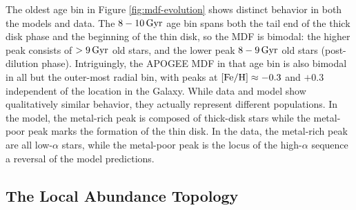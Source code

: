 \documentclass[twocolumn,twocolappendix,linenumbers]{aastex631}
\newcommand{\mathFeH}{{\rm [Fe/H]}}
\newcommand{\Gyr}{\,{\rm Gyr}}
\begin{document}
The oldest age bin in Figure \ref{fig:mdf-evolution} shows distinct behavior in both the models and data. The $8-10\Gyr$ age bin spans both the tail end of the thick disk phase and the beginning of the thin disk, so the MDF is bimodal: the higher peak consists of $>9\Gyr$ old stars, and the lower peak $8-9\Gyr$ old stars (post-dilution phase). Intriguingly, the APOGEE MDF in that age bin is also bimodal in all but the outer-most radial bin, with peaks at $\mathFeH\approx-0.3$ and $+0.3$ independent of the location in the Galaxy. While data and model show qualitatively similar behavior, they actually represent different populations. In the model, the metal-rich peak is composed of thick-disk stars while the metal-poor peak marks the formation of the thin disk. In the data, the metal-rich peak are all low-$\alpha$ stars, while the metal-poor peak is the locus of the high-$\alpha$ sequence \textemdash a reversal of the model predictions.

\subsection{The Local Abundance Topology}
\label{sec:abundance-distributions}
\end{document}
